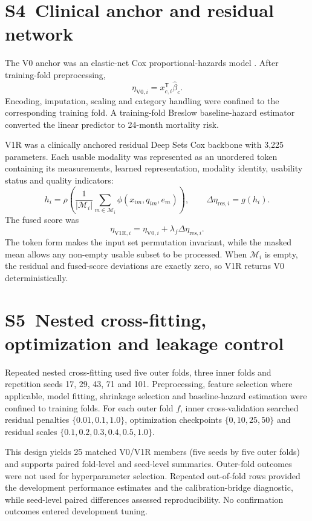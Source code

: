 \section*{S4~Clinical anchor and residual network}
The V0 anchor was an elastic-net Cox proportional-hazards model \cite{cox1972,breslow1974}. After training-fold preprocessing,
\begin{equation}
\eta_{\mathrm{V0},i}=x_{c,i}^{\mathsf T}\hat\beta_c.
\end{equation}
Encoding, imputation, scaling and category handling were confined to the corresponding training fold. A training-fold Breslow baseline-hazard estimator converted the linear predictor to 24-month mortality risk.

V1R was a clinically anchored residual Deep Sets Cox backbone with 3,225 parameters. Each usable modality was represented as an unordered token containing its measurements, learned representation, modality identity, usability status and quality indicators:
\begin{equation}
h_i=\rho\left(\frac{1}{|\mathcal{M}_i|}\sum_{m\in\mathcal{M}_i}\phi(x_{im},q_{im},e_m)\right),\qquad
\Delta\eta_{\mathrm{res},i}=g(h_i).
\end{equation}
The fused score was
\begin{equation}
\eta_{\mathrm{V1R},i}=\eta_{\mathrm{V0},i}+\lambda_f\Delta\eta_{\mathrm{res},i}.
\end{equation}
The token form makes the input set permutation invariant, while the masked mean allows any non-empty usable subset to be processed. When $\mathcal{M}_i$ is empty, the residual and fused-score deviations are exactly zero, so V1R returns V0 deterministically.

\section*{S5~Nested cross-fitting, optimization and leakage control}
Repeated nested cross-fitting used five outer folds, three inner folds and repetition seeds 17, 29, 43, 71 and 101. Preprocessing, feature selection where applicable, model fitting, shrinkage selection and baseline-hazard estimation were confined to training folds. For each outer fold $f$, inner cross-validation searched residual penalties $\{0.01,0.1,1.0\}$, optimization checkpoints $\{0,10,25,50\}$ and residual scales $\{0.1,0.2,0.3,0.4,0.5,1.0\}$.

This design yields 25 matched V0/V1R members (five seeds by five outer folds) and supports paired fold-level and seed-level summaries. Outer-fold outcomes were not used for hyperparameter selection. Repeated out-of-fold rows provided the development performance estimates and the calibration-bridge diagnostic, while seed-level paired differences assessed reproducibility. No confirmation outcomes entered development tuning.

